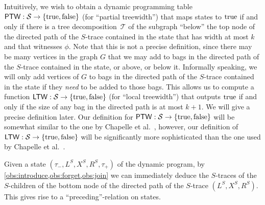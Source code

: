 \documentclass[a4paper,UKenglish,cleveref, autoref, thm-restate, numberwithinsect]{lipics-v2021}
\newcommand{\ptw}{\mathsf{PTW}}
\newcommand{\ltw}{\mathsf{LTW}}
\newcommand{\true}{\textup{true}}
\newcommand{\false}{\textup{false}}
\begin{document}
Intuitively, we wish to obtain a dynamic programming table $\ptw:\mathcal{S}\rightarrow \{\true,\false\}$ (for ``partial treewidth'') that maps states to $\true$ if and only if there is a tree decomposition~$\mathcal{T}$ of the subgraph ``below'' the top node of the directed path of the $S$-trace contained in the state that has width at most $k$ and that witnesses $\phi$. 
Note that this is not a precise definition, since there may be many vertices in the graph $G$ that we may add to bags in the directed path of the $S$-trace contained in the state, or above, or below it. Informally speaking, we will only add vertices of $G$ to bags in the directed path of the $S$-trace contained in the state if they \emph{need} to be added to those bags. This allows us to compute a function $\ltw:\mathcal{S}\rightarrow \{\true,\false\}$ (for ``local treewidth'') that outputs $\true$ if and only if the size of any bag in the directed path is at most $k+1$. 
We will give a precise definition later. Our definition for $\ptw:\mathcal{S}\rightarrow \{\true,\false\}$ will be somewhat similar to the one by Chapelle et al.~\cite{chapelle2017treewidth}, however, our definition of $\ltw:\mathcal{S}\rightarrow \{\true,\false\}$ will be significantly more sophisticated than the one used by Chapelle et al.~\cite{chapelle2017treewidth}.

Given a state $(\tau_-,L^S, X^S, R^S,\tau_+)$ of the dynamic program, by \cref{obs:introduce,obs:forget,obs:join} we can immediately deduce the $S$-traces of the $S$-children of the bottom node of the directed path of the $S$-trace $(L^S, X^S, R^S)$. 
This gives rise to a ``preceding''-relation on states. 
\end{document}
